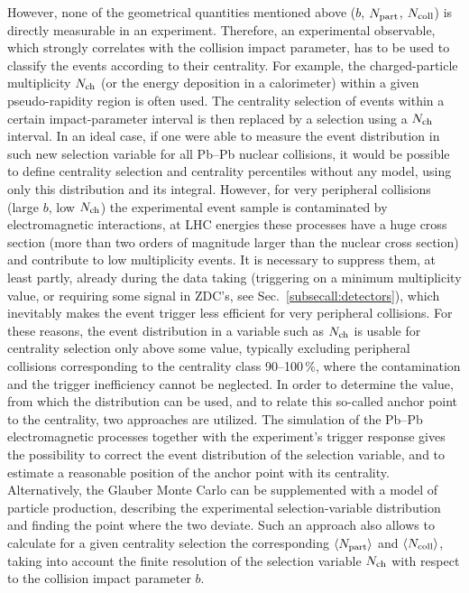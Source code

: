 However, none of the geometrical quantities mentioned above ($b$, $N_{\rm part}$, $N_{\rm coll}$) is directly measurable in an experiment. Therefore, an experimental observable, which strongly correlates with the collision impact parameter, has to be used to classify the events according to their centrality. For example, the charged-particle multiplicity $N_{\rm ch}$ (or the energy deposition in a calorimeter) within a given pseudo-rapidity region is often used. The centrality selection of events within a certain impact-parameter interval is then replaced by a selection using a $N_{\rm ch}$ interval. In an ideal case, if one were able to measure the event distribution in such new selection variable for all Pb--Pb nuclear collisions, it would be possible to define centrality selection and centrality percentiles without any model, using only this distribution and its integral. However, for very peripheral collisions (large $b$, low $N_{\rm ch}$) the experimental event sample is contaminated by electromagnetic interactions, at LHC energies these processes have  a huge cross section (more than two orders of magnitude larger than the nuclear cross section) and contribute to low multiplicity events. It is necessary to suppress them, at least partly, already during the data taking (triggering on a minimum multiplicity value, or requiring some signal in ZDC's, see Sec.~\ref{subsecall:detectors}), which inevitably makes the event trigger less efficient for very peripheral collisions. For these reasons, the event distribution in a variable such as $N_{\rm ch}$ is usable for centrality selection only above some value, typically excluding peripheral collisions corresponding to the centrality class 90--100\,\%, where the contamination and the trigger inefficiency cannot be neglected. In order to determine the value, from which the distribution can be used, and to relate this so-called anchor point to the centrality, two approaches are utilized. The simulation of the Pb--Pb electromagnetic processes together with the experiment's trigger response gives the possibility to correct the event distribution of the selection variable, and to estimate a reasonable position of the anchor point with its centrality. Alternatively, the Glauber Monte Carlo can be supplemented with a model of particle production, describing the experimental selection-variable distribution and finding the point where the two deviate. Such an approach also allows to calculate for a given centrality selection the corresponding $\langle N_{\rm part} \rangle$ and $\langle N_{\rm coll} \rangle$, taking into account the finite resolution of the selection variable $N_{\rm ch}$ with respect to the collision impact parameter $b$.

